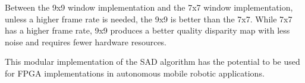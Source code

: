 Between the 9x9 window implementation and the 7x7 window implementation, unless a higher frame rate is needed, the 9x9 is better than the 7x7. While 7x7 has a higher frame rate, 9x9 produces a better quality disparity map with less noise and requires fewer hardware resources.

This modular implementation of the SAD algorithm has the potential to be used for FPGA implementations in autonomous mobile robotic applications.